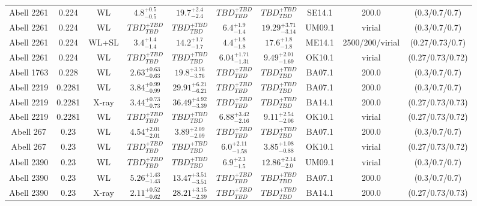 \begin{table}
\begin{tabular}{cccccccccc}
Abell 2261 & 0.224 & WL & ${4.8}^{+0.5}_{-0.5}$ & ${19.7}^{+2.4}_{-2.4}$ & ${TBD}^{+TBD}_{TBD}$ & ${TBD}^{+TBD}_{TBD}$ & SE14.1 & 200.0 & (0.3/0.7/0.7) \\
Abell 2261 & 0.224 & WL & ${TBD}^{+TBD}_{TBD}$ & ${TBD}^{+TBD}_{TBD}$ & ${6.4}^{+1.9}_{-1.4}$ & ${19.29}^{+3.71}_{-3.14}$ & UM09.1 & virial & (0.3/0.7/0.7) \\
Abell 2261 & 0.224 & WL+SL & ${3.4}^{+1.4}_{-1.4}$ & ${14.2}^{+1.7}_{-1.7}$ & ${4.4}^{+1.8}_{-1.8}$ & ${17.6}^{+1.8}_{-1.8}$ & ME14.1 & 2500/200/virial & (0.27/0.73/0.7) \\
Abell 2261 & 0.224 & WL & ${TBD}^{+TBD}_{TBD}$ & ${TBD}^{+TBD}_{TBD}$ & ${6.04}^{+1.71}_{-1.31}$ & ${9.49}^{+2.01}_{-1.69}$ & OK10.1 & virial & (0.27/0.73/0.72) \\
Abell 1763 & 0.228 & WL & ${2.63}^{+0.63}_{-0.63}$ & ${19.8}^{+3.76}_{-3.76}$ & ${TBD}^{+TBD}_{TBD}$ & ${TBD}^{+TBD}_{TBD}$ & BA07.1 & 200.0 & (0.3/0.7/0.7) \\
Abell 2219 & 0.2281 & WL & ${3.84}^{+0.99}_{-0.99}$ & ${29.91}^{+6.21}_{-6.21}$ & ${TBD}^{+TBD}_{TBD}$ & ${TBD}^{+TBD}_{TBD}$ & BA07.1 & 200.0 & (0.3/0.7/0.7) \\
Abell 2219 & 0.2281 & X-ray & ${3.44}^{+0.73}_{-0.73}$ & ${36.49}^{+4.92}_{-3.39}$ & ${TBD}^{+TBD}_{TBD}$ & ${TBD}^{+TBD}_{TBD}$ & BA14.1 & 200.0 & (0.27/0.73/0.73) \\
Abell 2219 & 0.2281 & WL & ${TBD}^{+TBD}_{TBD}$ & ${TBD}^{+TBD}_{TBD}$ & ${6.88}^{+3.42}_{-2.16}$ & ${9.11}^{+2.54}_{-2.06}$ & OK10.1 & virial & (0.27/0.73/0.72) \\
Abell 267 & 0.23 & WL & ${4.54}^{+2.01}_{-2.01}$ & ${3.89}^{+2.09}_{-2.09}$ & ${TBD}^{+TBD}_{TBD}$ & ${TBD}^{+TBD}_{TBD}$ & BA07.1 & 200.0 & (0.3/0.7/0.7) \\
Abell 267 & 0.23 & WL & ${TBD}^{+TBD}_{TBD}$ & ${TBD}^{+TBD}_{TBD}$ & ${6.0}^{+2.11}_{-1.58}$ & ${3.85}^{+1.08}_{-0.88}$ & OK10.1 & virial & (0.27/0.73/0.72) \\
Abell 2390 & 0.23 & WL & ${TBD}^{+TBD}_{TBD}$ & ${TBD}^{+TBD}_{TBD}$ & ${6.9}^{+2.3}_{-1.5}$ & ${12.86}^{+2.14}_{-2.0}$ & UM09.1 & virial & (0.3/0.7/0.7) \\
Abell 2390 & 0.23 & WL & ${5.26}^{+1.43}_{-1.43}$ & ${13.47}^{+3.51}_{-3.51}$ & ${TBD}^{+TBD}_{TBD}$ & ${TBD}^{+TBD}_{TBD}$ & BA07.1 & 200.0 & (0.3/0.7/0.7) \\
Abell 2390 & 0.23 & X-ray & ${2.11}^{+0.52}_{-0.62}$ & ${28.21}^{+3.15}_{-2.39}$ & ${TBD}^{+TBD}_{TBD}$ & ${TBD}^{+TBD}_{TBD}$ & BA14.1 & 200.0 & (0.27/0.73/0.73) \\

\end{tabular}
\end{table}
